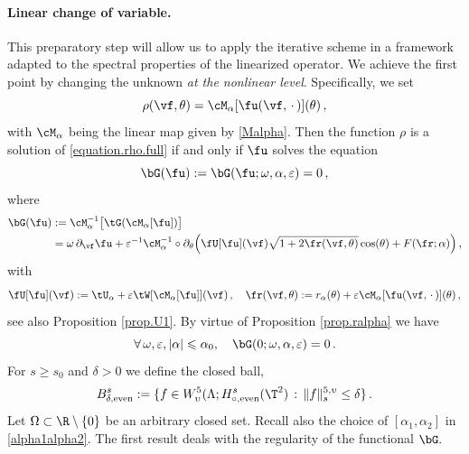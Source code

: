 \documentclass[a4paper,reqno,10pt]{article}
\newcommand{\pa}{\partial}
\begin{document}
\paragraph{Linear change of variable.} This preparatory step will allow us to apply the iterative scheme in a framework adapted to the spectral properties of the linearized operator.
We achieve the first point by changing the unknown {\it at the nonlinear level}. Specifically, we set
\begin{equation}
	\rho(\vf,\theta) = \cM_{\alpha}[\fu(\vf,\,\cdot\,)](\theta) \,,
\end{equation}
with $\cM_{\alpha}$ being the linear map given by  \eqref{Malpha}. Then the function $\rho$ is a solution of \eqref{equation.rho.full} if and only if $\fu$ solves the equation
\begin{equation}\label{G(u).equa}
		\bG(\fu):=\bG(\fu;\omega,\alpha,\varepsilon) = 0\,,
\end{equation}
where
\begin{equation}\label{G(u).def}
	\begin{aligned}
		\bG(\fu) & := \cM_{\alpha}^{-1}\big[ \tG(\cM_{\alpha}[\fu])\big] \\
		&= \omega\,\pa_{\vf} \fu +\varepsilon^{-1} \cM_{\alpha}^{-1} \circ \pa_{\theta}\Big( \fU[\fu](\vf) \sqrt{1+2 \fr(\vf,\theta)}\cos(\theta) + F(\fr;\alpha) \Big) \,,
	\end{aligned}
\end{equation}
with
\begin{equation}\label{tU.fr}
	\begin{aligned}
		\fU[\fu](\vf) := \tU_{\alpha} +\varepsilon \tW[\cM_{\alpha}[\fu]](\vf)\,, \quad \fr(\vf,\theta):= r_\alpha(\theta) + \varepsilon\cM_{\alpha}[\fu(\vf,\,\cdot\,)](\theta) \,,
	\end{aligned}
\end{equation}
see also Proposition \ref{prop.U1}.
By virtue of Proposition \ref{prop.ralpha} we have  
\begin{equation}\label{bG.equizero}
	\forall \, \omega, \varepsilon, |\alpha|\leqslant\alpha_0,\quad \bG(0;\omega,\alpha,\varepsilon)=0 \,.
\end{equation}
For $s\geq s_0$ and $\delta>0$ we define the closed ball,
\begin{equation*}
	B_{\delta,\textnormal{even}}^{s} := \{ f \in {W_\upsilon^5(\Lambda;H^s_{\circ,\textnormal{even}}(\T^2)} \, : \, \| f\|_{s}^{5,\upsilon}\leq \delta \}\,.
\end{equation*}
Let $\Omega\subset \R\setminus\{0\}$ be an arbitrary closed set.
Recall also the choice of $[\alpha_{1},\alpha_{2}]$ in \eqref{alpha1alpha2}. The first result deals with the regularity of the functional $\bG.$
\end{document}
